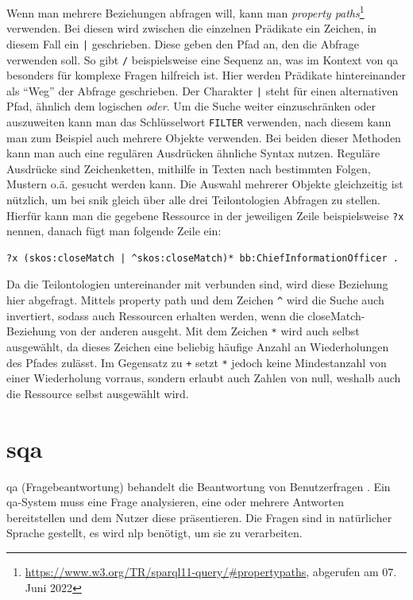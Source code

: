 Wenn man mehrere Beziehungen abfragen will, kann man \emph{property paths}\footnote{\url{https://www.w3.org/TR/sparql11-query/\#propertypaths}, abgerufen am 07. Juni 2022} verwenden.
Bei diesen wird zwischen die einzelnen Prädikate ein Zeichen, in diesem Fall ein \texttt{|} geschrieben.
Diese geben den Pfad an, den die Abfrage verwenden soll.
So gibt \texttt{/} beispielsweise eine Sequenz an, was im Kontext von \acl*{qa} besonders für komplexe Fragen hilfreich ist.
Hier werden Prädikate hintereinander als \enquote{Weg} der Abfrage geschrieben.
Der Charakter \texttt{|} steht für einen alternativen Pfad, ähnlich dem logischen \emph{oder}.
Um die Suche weiter einzuschränken oder auszuweiten kann man das Schlüsselwort \texttt{FILTER} verwenden, nach diesem kann man zum Beispiel auch mehrere Objekte verwenden.
Bei beiden dieser Methoden kann man auch eine regulären Ausdrücken ähnliche Syntax nutzen.
Reguläre Ausdrücke sind Zeichenketten, mithilfe in Texten nach bestimmten Folgen, Mustern o.ä. gesucht werden kann.
Die Auswahl mehrerer Objekte gleichzeitig ist nützlich, um bei \acs{snik} gleich über alle drei Teilontologien Abfragen zu stellen.
Hierfür kann man die gegebene Ressource in der jeweiligen Zeile beispielsweise \texttt{?x} nennen, danach fügt man folgende Zeile ein:
\begin{lstlisting}[language=SPARQL]
?x (skos:closeMatch | ^skos:closeMatch)* bb:ChiefInformationOfficer .
\end{lstlisting}
Da die Teilontologien untereinander mit  verbunden sind, wird diese Beziehung hier abgefragt.
Mittels property path und dem Zeichen \texttt{\^} wird die Suche auch invertiert, sodass auch Ressourcen erhalten werden, wenn die closeMatch-Beziehung von der anderen ausgeht.
Mit dem Zeichen \texttt{*} wird auch  selbst ausgewählt, da dieses Zeichen eine beliebig häufige Anzahl an Wiederholungen des Pfades zulässt.
Im Gegensatz zu \texttt{+} setzt \texttt{*} jedoch keine Mindestanzahl von einer Wiederholung vorraus, sondern erlaubt auch Zahlen von null,
weshalb auch die Ressource selbst ausgewählt wird.

\section[Semantisches Question Answering]{\acl*{sqa}}

\begin{definition}
\acl{qa} (Fragebeantwortung) behandelt die Beantwortung von Benutzerfragen \citep{qadefinition}.
Ein \acf{qa}-System muss eine Frage analysieren, eine oder mehrere Antworten bereitstellen und dem Nutzer diese präsentieren.
Die Fragen sind in natürlicher Sprache gestellt, es wird \acs{nlp} benötigt, um sie zu verarbeiten.
\end{definition}

